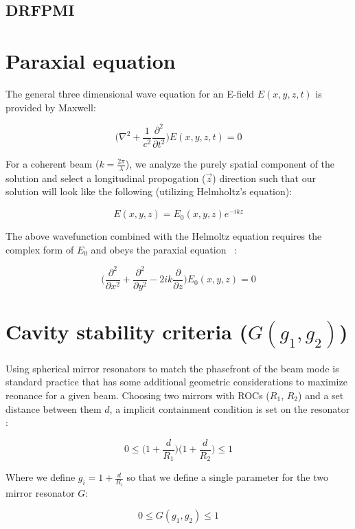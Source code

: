 \subsection{DRFPMI}\label{appendix:DRFPMI}


\section{Paraxial equation} \label{sec:paraxial}

The general three dimensional wave equation for an E-field $E(x,y,z,t)$ is provided by Maxwell:

$$ \label{eq:waveq}
	\bigg( \nabla ^2 + \frac{1}{c^2} \frac{\partial^2}{\partial t^2} \bigg) E(x,y,z,t) = 0
$$

For a coherent beam ($k = \frac{2 \pi}{\lambda}$), we analyze the purely spatial component of the solution and select a longitudinal propogation ($\vec{z}$) direction such that our solution will look like the following (utilizing Helmholtz's equation):

$$
	E(x,y,z) = E_0(x,y,z) e^{-ikz}
$$

The above wavefunction combined with the Helmoltz equation requires the complex form of $E_0$ and obeys the paraxial equation ~\cite{kogelnik:1966}:

\begin{equation}\label{eq:paraxial}
	\bigg( \frac{\partial^2}{\partial x ^2} + \frac{\partial^2}{\partial y^2} - 2ik \frac{\partial}{\partial z} \bigg) E_0(x,y,z) = 0
\end{equation}

\section{Cavity stability criteria ($G(g_1,g_2)$)} \label{sec:cavstab}
Using spherical mirror resonators to match the phasefront of the beam mode is standard practice that has some additional geometric considerations to maximize reonance for a given beam. Choosing two mirrors with ROCs ($R_1$, $R_2$) and a set distance between them $d$, a implicit containment condition is set on the resonator \cite{salehteich:2007}:

$$
	0 \leq \bigg(1 + \frac{d}{R_1} \bigg) \bigg(1 + \frac{d}{R_2} \bigg) \leq 1
$$

Where we define $g_i = 1 + \frac{d}{R_i}$ so that we define a single parameter for the two mirror resonator $G$:

\begin{equation}\label{eq:cavstab}
	0 \leq G(g_1,g_2) \leq 1
\end{equation}


